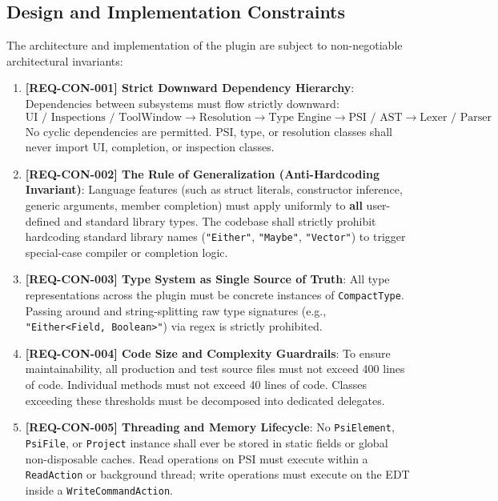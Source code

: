 \subsection{Design and Implementation Constraints}
\label{sec:constraints}
The architecture and implementation of the plugin are subject to non-negotiable architectural invariants:

\begin{enumerate}
    \item \textbf{[REQ-CON-001] Strict Downward Dependency Hierarchy}:
    Dependencies between subsystems must flow strictly downward:
    \begin{equation*}
        \text{UI / Inspections / ToolWindow} \longrightarrow \text{Resolution} \longrightarrow \text{Type Engine} \longrightarrow \text{PSI / AST} \longrightarrow \text{Lexer / Parser}
    \end{equation*}
    No cyclic dependencies are permitted. PSI, type, or resolution classes shall never import UI, completion, or inspection classes.
    
    \item \textbf{[REQ-CON-002] The Rule of Generalization (Anti-Hardcoding Invariant)}:
    Language features (such as struct literals, constructor inference, generic arguments, member completion) must apply uniformly to \textbf{all} user-defined and standard library types. The codebase shall strictly prohibit hardcoding standard library names (\texttt{"Either"}, \texttt{"Maybe"}, \texttt{"Vector"}) to trigger special-case compiler or completion logic.
    
    \item \textbf{[REQ-CON-003] Type System as Single Source of Truth}:
    All type representations across the plugin must be concrete instances of \texttt{CompactType}. Passing around and string-splitting raw type signatures (e.g., \texttt{"Either<Field, Boolean>"}) via regex is strictly prohibited.
    
    \item \textbf{[REQ-CON-004] Code Size and Complexity Guardrails}:
    To ensure maintainability, all production and test source files must not exceed 400 lines of code. Individual methods must not exceed 40 lines of code. Classes exceeding these thresholds must be decomposed into dedicated delegates.
    
    \item \textbf{[REQ-CON-005] Threading and Memory Lifecycle}:
    No \texttt{PsiElement}, \texttt{PsiFile}, or \texttt{Project} instance shall ever be stored in static fields or global non-disposable caches. Read operations on PSI must execute within a \texttt{ReadAction} or background thread; write operations must execute on the EDT inside a \texttt{WriteCommandAction}.
\end{enumerate}


